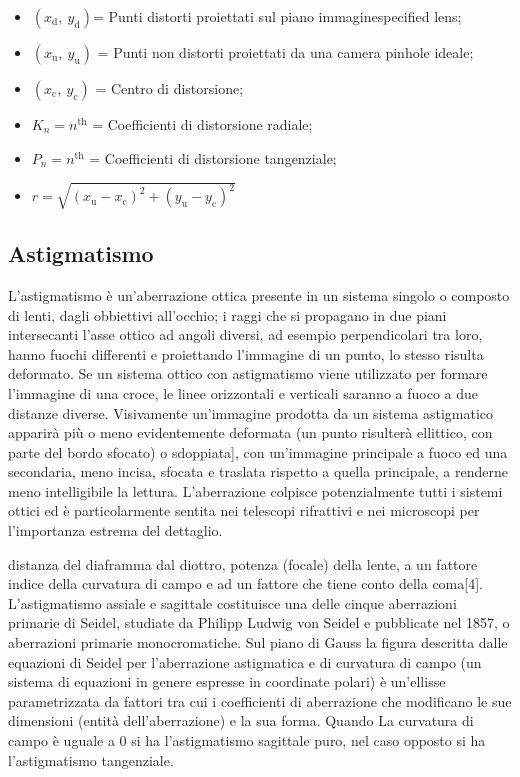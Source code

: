 \begin{itemize}

\item $(x_\mathrm{d},\ y_\mathrm{d})$=  Punti distorti proiettati sul piano immaginespecified lens;
\item $(x_\mathrm{u},\ y_\mathrm{u})$ = Punti non distorti proiettati da una camera pinhole ideale;
\item $(x_\mathrm{c},\ y_\mathrm{c})$ = Centro di distorsione;
\item $K_n = n^{\mathrm{th}}$ = Coefficienti di distorsione radiale;
\item $P_n = n^{\mathrm{th}}$ = Coefficienti di distorsione tangenziale;
\item $r = \sqrt{(x_\mathrm{u}-x_\mathrm{c})^2 + (y_\mathrm{u}-y_\mathrm{c})^2}$
\end{itemize}


\subsection{Astigmatismo}

L'astigmatismo è un'aberrazione ottica presente in un sistema singolo o
composto di lenti, dagli obbiettivi all'occhio; i raggi che si propagano in
due piani intersecanti l'asse ottico ad angoli diversi, ad esempio
perpendicolari tra loro, hanno fuochi differenti e proiettando l'immagine di
un punto, lo stesso risulta deformato. Se un sistema ottico con astigmatismo
viene utilizzato per formare l'immagine di una croce, le linee orizzontali e
verticali saranno a fuoco a due distanze diverse. Visivamente un'immagine
prodotta da un sistema astigmatico apparirà più o meno evidentemente deformata
(un punto risulterà ellittico, con parte del bordo sfocato) o sdoppiata], con
un'immagine principale a fuoco ed una secondaria, meno incisa, sfocata e
traslata rispetto a quella principale, a renderne meno intelligibile la
lettura. L'aberrazione colpisce potenzialmente tutti i sistemi ottici ed è
particolarmente sentita nei telescopi rifrattivi e nei microscopi  per
l'importanza estrema del dettaglio.

distanza del diaframma dal diottro, potenza (focale) della lente, a un fattore
indice della curvatura di campo e ad un fattore che tiene conto della coma[4].
L'astigmatismo assiale e sagittale costituisce una delle cinque aberrazioni
primarie di Seidel, studiate da Philipp Ludwig von Seidel e pubblicate nel
1857, o aberrazioni primarie monocromatiche. Sul piano di Gauss la figura
descritta dalle equazioni di Seidel per l'aberrazione astigmatica e di
curvatura di campo (un sistema di equazioni in genere espresse in coordinate
polari) è un’ellisse parametrizzata da fattori tra cui i coefficienti di
aberrazione che modificano le sue dimensioni (entità dell'aberrazione) e la
sua forma. Quando La curvatura di campo è uguale a 0 si ha l’astigmatismo
sagittale puro, nel caso opposto si ha l’astigmatismo tangenziale.

